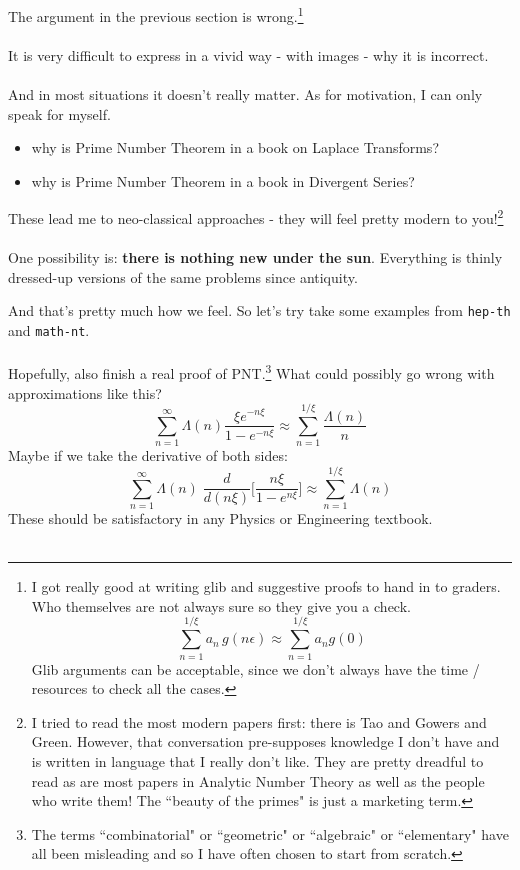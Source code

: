 \documentclass[12pt]{article}
\begin{document}
\newpage

\selectfont \fontsize{25}{30}\selectfont

\noindent The argument in the previous section is wrong.\footnote{I got really good at writing glib and suggestive proofs to hand in to graders.  Who themselves are not always sure so they give you a check.
$$ \sum^{1/\xi}_{n=1} a_n \, g( n \epsilon) \approx \sum^{1/\xi}_{n=1} a_n g(0) $$
Glib arguments can be acceptable, since we don't always have the time / resources to check all the cases.}  \\ \\It is very difficult to express in a vivid way - with images - why it is incorrect.  \\ \\
And in most situations it doesn't really matter. As for motivation, I can only speak for myself. \\
\begin{itemize}
\item why is Prime Number Theorem in a book on Laplace Transforms?
\item why is Prime Number Theorem in a book in Divergent Series? \\
\end{itemize}
These lead me to neo-classical approaches - they will feel pretty modern to you!\footnote{I tried to read the most modern papers first: there is Tao and Gowers and Green.  However, that conversation pre-supposes knowledge I don't have and is written in language that I really don't like.  They are pretty dreadful to read as are most papers in Analytic Number Theory as well as the people who write them!  The ``beauty of the primes" is just a marketing term.} \\ \\
One possibility is: \textbf{there is nothing new under the sun}.  Everything is thinly dressed-up versions of the same problems since antiquity.
\newpage

\noindent And that's pretty much how we feel.  So let's try take some examples from \texttt{hep-th} and \texttt{math-nt}. \\ \\
Hopefully, also finish a real proof of PNT.\footnote{The terms ``combinatorial" or ``geometric" or ``algebraic" or ``elementary" have all been misleading and so I have often chosen to start from scratch.}  What could possibly go wrong with approximations like this? 
$$ \sum_{n=1}^\infty \Lambda(n) \frac{\xi e^{-n\xi}}{1-e^{-n\xi}} \approx \sum_{n=1}^{1/\xi} \frac{\Lambda(n)}{n} $$
Maybe if we take the derivative of both sides:
$$  \sum_{n=1}^\infty \Lambda(n) \; \frac{d}{d(n\xi)}\bigg[ \frac{n\xi }{1-e^{n\xi}} \bigg]  \approx \sum_{n=1}^{1/\xi} \Lambda(n) $$
These should be satisfactory in any Physics or Engineering textbook. \\ \\
\end{document}
